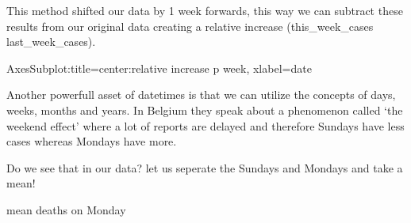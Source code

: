\documentclass[letterpaper,10pt,english]{jupyterBook}
\begin{document}
\sphinxAtStartPar
This method shifted our data by 1 week forwards, this way we can subtract these results from our original data creating a relative increase (this\_week\_cases \sphinxhyphen{} last\_week\_cases).

\begin{sphinxVerbatim}[commandchars=\\\{\}]
\end{sphinxVerbatim}

\begin{sphinxVerbatim}[commandchars=\\\{\}]
\PYGZlt{}AxesSubplot:title=\PYGZob{}\PYGZsq{}center\PYGZsq{}:\PYGZsq{}relative increase p week\PYGZsq{}\PYGZcb{}, xlabel=\PYGZsq{}date\PYGZsq{}\PYGZgt{}
\end{sphinxVerbatim}

\noindent{}

\sphinxAtStartPar
Another powerfull asset of datetimes is that we can utilize the concepts of days, weeks, months and years.
In Belgium they speak about a phenomenon called ‘the weekend effect’ where a lot of reports are delayed and therefore Sundays have less cases whereas Mondays have more.

\sphinxAtStartPar
Do we see that in our data? let us seperate the Sundays and Mondays and take a mean!

\begin{sphinxVerbatim}[commandchars=\\\{\}]
\PYG{p}{[}\PYG{p}{]}
\end{sphinxVerbatim}

\begin{sphinxVerbatim}[commandchars=\\\{\}]
mean deaths on Monday
\end{sphinxVerbatim}
\end{document}
